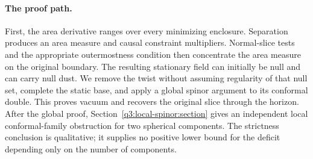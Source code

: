 \paragraph{The proof path.}
First, the area derivative ranges over every minimizing enclosure.
Separation produces an area measure and causal constraint multipliers.
Normal-slice tests and the appropriate outermostness condition then
concentrate the area measure on the original boundary.  The resulting
stationary field can initially be null and can carry null dust.
We remove the twist without assuming regularity of that null set,
complete the static base, and apply a global spinor argument to its
conformal double.  This proves vacuum and recovers the original slice
through the horizon. After the global proof,
Section~\ref{q3:local-spinor:section} gives an independent local
conformal-family obstruction for two spherical components.
The strictness conclusion is qualitative; it supplies no positive
lower bound for the deficit depending only on the number of components.
